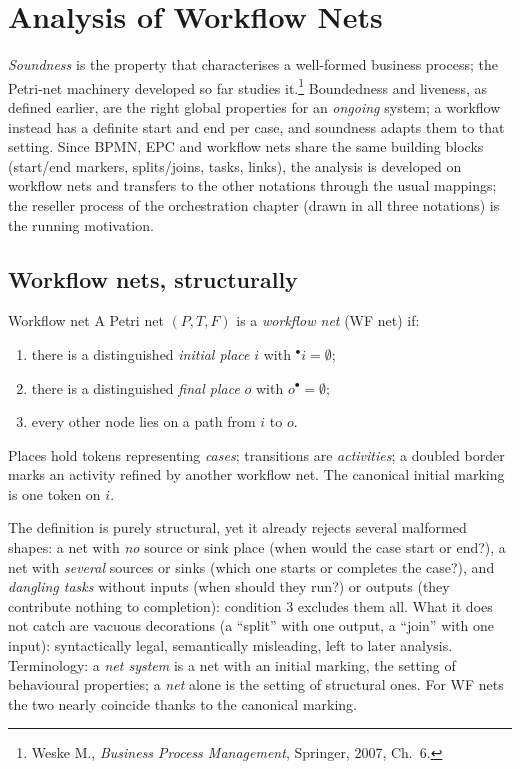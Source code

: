\section{Analysis of Workflow Nets}

\emph{Soundness} is the property that characterises a well-formed business process; the Petri-net machinery developed so far studies it.\footnote{Weske M., \emph{Business Process Management}, Springer, 2007, Ch.~6.} Boundedness and liveness, as defined earlier, are the right global properties for an \emph{ongoing} system; a workflow instead has a definite start and end per case, and soundness adapts them to that setting. Since BPMN, EPC and workflow nets share the same building blocks (start/end markers, splits/joins, tasks, links), the analysis is developed on workflow nets and transfers to the other notations through the usual mappings; the reseller process of the orchestration chapter (drawn in all three notations) is the running motivation.

\subsection{Workflow nets, structurally}

\begin{definitionbox}{Workflow net}
A Petri net $(P, T, F)$ is a \emph{workflow net} (WF net) if:
\begin{enumerate}
  \item there is a distinguished \emph{initial place} $i$ with ${}^\bullet i = \emptyset$;
  \item there is a distinguished \emph{final place} $o$ with $o^\bullet = \emptyset$;
  \item every other node lies on a path from $i$ to $o$.
\end{enumerate}
Places hold tokens representing \emph{cases}; transitions are \emph{activities}; a doubled border marks an activity refined by another workflow net. The canonical initial marking is one token on $i$.
\end{definitionbox}

The definition is purely structural, yet it already rejects several malformed shapes: a net with \emph{no} source or sink place (when would the case start or end?), a net with \emph{several} sources or sinks (which one starts or completes the case?), and \emph{dangling tasks} without inputs (when should they run?) or outputs (they contribute nothing to completion): condition 3 excludes them all. What it does not catch are vacuous decorations (a ``split'' with one output, a ``join'' with one input): syntactically legal, semantically misleading, left to later analysis. Terminology: a \emph{net system} is a net with an initial marking, the setting of behavioural properties; a \emph{net} alone is the setting of structural ones. For WF nets the two nearly coincide thanks to the canonical marking.


